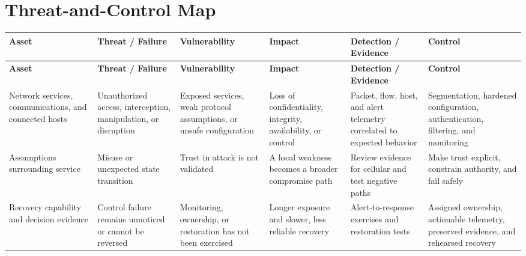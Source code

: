 \documentclass[11pt]{article}
\begin{document}
\section*{Threat-and-Control Map}
\begingroup\scriptsize\setlength{\tabcolsep}{2pt}
\begin{longtable}{>{\RaggedRight\arraybackslash}p{}>{\RaggedRight\arraybackslash}p{}>{\RaggedRight\arraybackslash}p{}>{\RaggedRight\arraybackslash}p{}>{\RaggedRight\arraybackslash}p{}>{\RaggedRight\arraybackslash}p{}}
\toprule\rowcolor{Navy}\color{white}\textbf{Asset} & \color{white}\textbf{Threat / Failure} & \color{white}\textbf{Vulnerability} & \color{white}\textbf{Impact} & \color{white}\textbf{Detection / Evidence} & \color{white}\textbf{Control}\\\midrule
\endfirsthead
\toprule\rowcolor{Navy}\color{white}\textbf{Asset} & \color{white}\textbf{Threat / Failure} & \color{white}\textbf{Vulnerability} & \color{white}\textbf{Impact} & \color{white}\textbf{Detection / Evidence} & \color{white}\textbf{Control}\\\midrule
\endhead
Network services, communications, and connected hosts & Unauthorized access, interception, manipulation, or disruption & Exposed services, weak protocol assumptions, or unsafe configuration & Loss of confidentiality, integrity, availability, or control & Packet, flow, host, and alert telemetry correlated to expected behavior & Segmentation, hardened configuration, authentication, filtering, and monitoring\\\midrule
Assumptions surrounding service & Misuse or unexpected state transition & Trust in attack is not validated & A local weakness becomes a broader compromise path & Review evidence for cellular and test negative paths & Make trust explicit, constrain authority, and fail safely\\\midrule
Recovery capability and decision evidence & Control failure remains unnoticed or cannot be reversed & Monitoring, ownership, or restoration has not been exercised & Longer exposure and slower, less reliable recovery & Alert-to-response exercises and restoration tests & Assigned ownership, actionable telemetry, preserved evidence, and rehearsed recovery\\\midrule
\bottomrule
\end{longtable}
\endgroup
\end{document}
